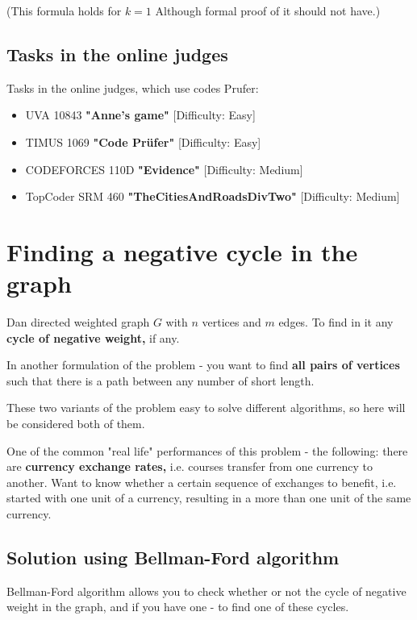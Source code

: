 (This formula holds for $k = 1$ Although formal proof of it should not have.)

\subsection{ Tasks in the online judges }

Tasks in the online judges, which use codes Prufer:

\begin{itemize}

\item UVA 10843 \textbf{"Anne's game"} [Difficulty: Easy]

\item TIMUS 1069 \textbf{"Code Prüfer"} [Difficulty: Easy]

\item CODEFORCES 110D \textbf{"Evidence"} [Difficulty: Medium]

\item TopCoder SRM 460 \textbf{"TheCitiesAndRoadsDivTwo"} [Difficulty: Medium]

\end{itemize}

\section{ Finding a negative cycle in the graph }
Dan directed weighted graph $G$ with $n$ vertices and $m$ edges. To find in it any \textbf{cycle of negative weight,} if any.

In another formulation of the problem - you want to find \textbf{all pairs of vertices} such that there is a path between any number of short length.

These two variants of the problem easy to solve different algorithms, so here will be considered both of them.

One of the common "real life" performances of this problem - the following: there are \textbf{currency exchange rates,} i.e. courses transfer from one currency to another. Want to know whether a certain sequence of exchanges to benefit, i.e. started with one unit of a currency, resulting in a more than one unit of the same currency.

\subsection{ Solution using Bellman-Ford algorithm }

Bellman-Ford algorithm allows you to check whether or not the cycle of negative weight in the graph, and if you have one - to find one of these cycles.

